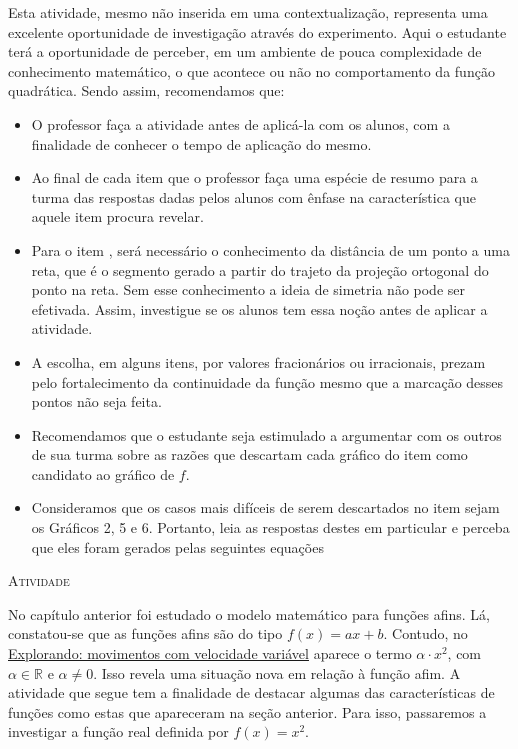 \documentclass[10 pt,usenames,dvipsnames, oneside]{article}
\begin{document}
\begin{goals}
\tcblower

Esta atividade, mesmo não inserida em uma contextualização, representa uma excelente oportunidade de investigação através do experimento. Aqui o estudante terá a oportunidade de perceber, em um ambiente de pouca complexidade de conhecimento matemático, o que acontece ou não no comportamento da função quadrática. Sendo assim, recomendamos que:

\begin{itemize}[itemsep=0pt]
\item O professor faça a atividade antes de aplicá-la com os alunos, com a finalidade de conhecer o tempo de aplicação do mesmo.
\item Ao final de cada item que o professor faça uma espécie de resumo para a turma das respostas dadas pelos alunos com ênfase na característica que aquele item procura revelar.
\item Para o item , será necessário o conhecimento da distância de um ponto a uma reta, que é o segmento gerado a partir do trajeto da projeção ortogonal do ponto na reta. Sem esse conhecimento a ideia de simetria não pode ser efetivada. Assim, investigue se os alunos tem essa noção antes de aplicar a atividade.
\item A escolha, em alguns itens, por valores fracionários ou irracionais, prezam pelo fortalecimento da continuidade da função mesmo que a marcação desses pontos não seja feita.
\item Recomendamos que o estudante seja estimulado a argumentar com os outros de sua turma sobre as razões que descartam cada gráfico do item  como candidato ao gráfico de $f$.
\item Consideramos que os casos mais difíceis de serem descartados no item  sejam os Gráficos 2, 5 e 6. Portanto, leia as respostas destes em particular e perceba que eles foram gerados pelas seguintes equações
\end{itemize}
\end{goals}

\bigskip
\begin{center}
{\large \scshape Atividade}
\end{center}
\fi

No capítulo anterior foi estudado o modelo matemático para funções afins. Lá, constatou-se que as funções afins são do tipo \(f(x)=ax+b\). Contudo, no \hyperref[\detokenize{AF209-0:sec-funcao-quadratica-movimento-com-velocidade-variavel-queda-vertical}]{Explorando: movimentos com velocidade variável} aparece o termo \(\alpha \cdot x^2\), com \(\alpha \in \mathbb{R}\) e \(\alpha \neq 0\). Isso revela uma situação nova em relação à função afim. A atividade que segue tem a finalidade de destacar algumas das características de funções como estas que apareceram na seção anterior. Para isso, passaremos a investigar a função real definida por \(f(x)=x^2\).
\end{document}
